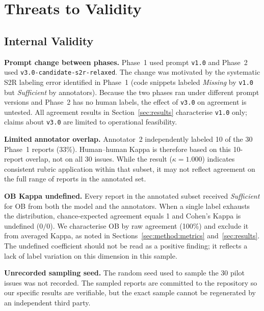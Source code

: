 

\section{Threats to Validity}\label{sec:threats}

\subsection{Internal Validity}

\textbf{Prompt change between phases.}
Phase~1 used prompt \texttt{v1.0} and Phase~2 used
\texttt{v3.0-candidate-s2r-relaxed}.  The change was motivated by the
systematic S2R labeling error identified in Phase~1 (code snippets
labeled \textit{Missing} by \texttt{v1.0} but \textit{Sufficient} by
annotators).  Because the two phases ran under different prompt
versions and Phase~2 has no human labels, the effect of \texttt{v3.0}
on agreement is untested.  All agreement results in
Section~\ref{sec:results} characterise \texttt{v1.0} only; claims
about \texttt{v3.0} are limited to operational feasibility.

\textbf{Limited annotator overlap.}
Annotator~2 independently labeled 10 of the 30 Phase~1 reports
(33\%).  Human--human Kappa is therefore based on this 10-report
overlap, not on all 30 issues.  While the result ($\kappa = 1.000$)
indicates consistent rubric application within that subset, it may not
reflect agreement on the full range of reports in the annotated set.

\textbf{OB Kappa undefined.}
Every report in the annotated subset received \textit{Sufficient} for
OB from both the model and the annotators.  When a single label
exhausts the distribution, chance-expected agreement equals 1 and
Cohen's Kappa is undefined ($0/0$).  We characterise OB by raw
agreement (100\%) and exclude it from averaged Kappa, as noted in
Sections~\ref{sec:method:metrics} and~\ref{sec:results}.  The
undefined coefficient should not be read as a positive finding; it
reflects a lack of label variation on this dimension in this sample.

\textbf{Unrecorded sampling seed.}
The random seed used to sample the 30 pilot issues was not recorded.
The sampled reports are committed to the repository so our specific
results are verifiable, but the exact sample cannot be regenerated by
an independent third party.

